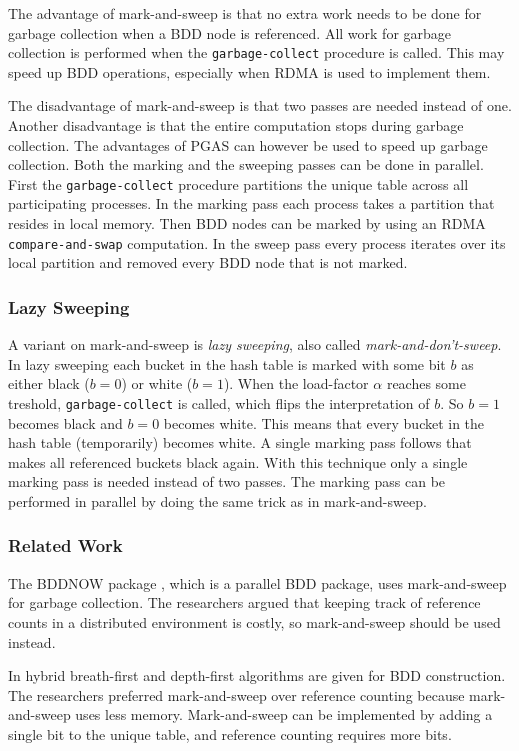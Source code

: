 The advantage of mark-and-sweep is that no extra work needs to be done for garbage collection when a BDD node is referenced. All work for garbage collection is performed when the \texttt{garbage-collect} procedure is called. This may speed up BDD operations, especially when RDMA is used to implement them. 

The disadvantage of mark-and-sweep is that two passes are needed instead of one. Another disadvantage is that the entire computation stops during garbage collection. The advantages of PGAS can however be used to speed up garbage collection. Both the marking and the sweeping passes can be done in parallel. First the \texttt{garbage-collect} procedure partitions the unique table across all participating processes. In the marking pass each process takes a partition that resides in local memory. Then BDD nodes can be marked by using an RDMA \texttt{compare-and-swap} computation. In the sweep pass every process iterates over its local partition and removed every BDD node that is not marked.

\subsubsection{Lazy Sweeping}
A variant on mark-and-sweep is \emph{lazy sweeping}, also called \emph{mark-and-don't-sweep}. In lazy sweeping each bucket in the hash table is marked with some bit $b$ as either black ($b=0$) or white ($b=1$). When the load-factor $\alpha$ reaches some treshold, \texttt{garbage-collect} is called, which flips the interpretation of $b$. So $b=1$ becomes black and $b=0$ becomes white. This means that every bucket in the hash table (temporarily) becomes white. A single marking pass follows that makes all referenced buckets black again. With this technique only a single marking pass is needed instead of two passes. The marking pass can be performed in parallel by doing the same trick as in mark-and-sweep.

\subsubsection{Related Work}
The BDDNOW package \cite{bddnow}, which is a parallel BDD package, uses mark-and-sweep for garbage collection. The researchers argued that keeping track of reference counts in a distributed environment is costly, so mark-and-sweep should be used instead.

In \cite{chen1997breadth} hybrid breath-first and depth-first algorithms are given for BDD construction. The researchers preferred mark-and-sweep over reference counting because mark-and-sweep uses less memory. Mark-and-sweep can be implemented by adding a single bit to the unique table, and reference counting requires more bits. 


